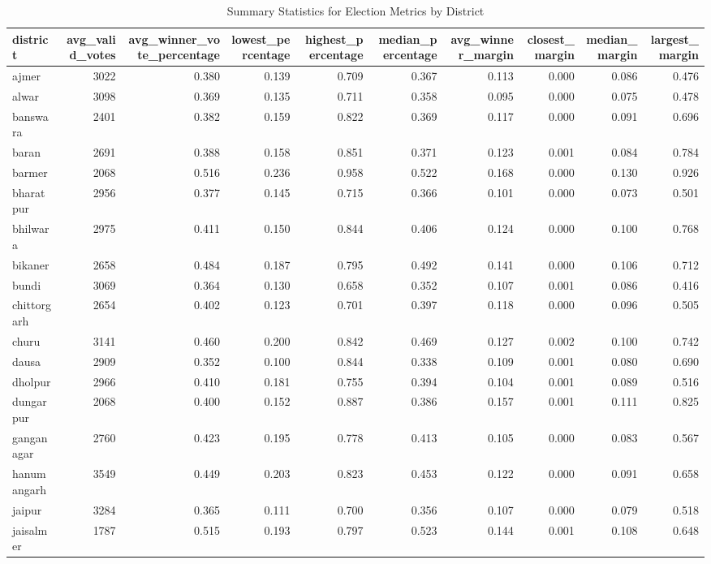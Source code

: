 \begin{table}[!h]
\centering
\caption{Summary Statistics for Election Metrics by District}
\centering
\begin{tabular}[t]{lrrrrrrrrr}
\toprule
district & avg\_valid\_votes & avg\_winner\_vote\_percentage & lowest\_percentage & highest\_percentage & median\_percentage & avg\_winner\_margin & closest\_margin & median\_margin & largest\_margin\\
\midrule
ajmer & 3022 & 0.380 & 0.139 & 0.709 & 0.367 & 0.113 & 0.000 & 0.086 & 0.476\\
alwar & 3098 & 0.369 & 0.135 & 0.711 & 0.358 & 0.095 & 0.000 & 0.075 & 0.478\\
banswara & 2401 & 0.382 & 0.159 & 0.822 & 0.369 & 0.117 & 0.000 & 0.091 & 0.696\\
baran & 2691 & 0.388 & 0.158 & 0.851 & 0.371 & 0.123 & 0.001 & 0.084 & 0.784\\
barmer & 2068 & 0.516 & 0.236 & 0.958 & 0.522 & 0.168 & 0.000 & 0.130 & 0.926\\
\addlinespace
bharatpur & 2956 & 0.377 & 0.145 & 0.715 & 0.366 & 0.101 & 0.000 & 0.073 & 0.501\\
bhilwara & 2975 & 0.411 & 0.150 & 0.844 & 0.406 & 0.124 & 0.000 & 0.100 & 0.768\\
bikaner & 2658 & 0.484 & 0.187 & 0.795 & 0.492 & 0.141 & 0.000 & 0.106 & 0.712\\
bundi & 3069 & 0.364 & 0.130 & 0.658 & 0.352 & 0.107 & 0.001 & 0.086 & 0.416\\
chittorgarh & 2654 & 0.402 & 0.123 & 0.701 & 0.397 & 0.118 & 0.000 & 0.096 & 0.505\\
\addlinespace
churu & 3141 & 0.460 & 0.200 & 0.842 & 0.469 & 0.127 & 0.002 & 0.100 & 0.742\\
dausa & 2909 & 0.352 & 0.100 & 0.844 & 0.338 & 0.109 & 0.001 & 0.080 & 0.690\\
dholpur & 2966 & 0.410 & 0.181 & 0.755 & 0.394 & 0.104 & 0.001 & 0.089 & 0.516\\
dungarpur & 2068 & 0.400 & 0.152 & 0.887 & 0.386 & 0.157 & 0.001 & 0.111 & 0.825\\
ganganagar & 2760 & 0.423 & 0.195 & 0.778 & 0.413 & 0.105 & 0.000 & 0.083 & 0.567\\
\addlinespace
hanumangarh & 3549 & 0.449 & 0.203 & 0.823 & 0.453 & 0.122 & 0.000 & 0.091 & 0.658\\
jaipur & 3284 & 0.365 & 0.111 & 0.700 & 0.356 & 0.107 & 0.000 & 0.079 & 0.518\\
jaisalmer & 1787 & 0.515 & 0.193 & 0.797 & 0.523 & 0.144 & 0.001 & 0.108 & 0.648\\

\end{tabular}
\end{table}
